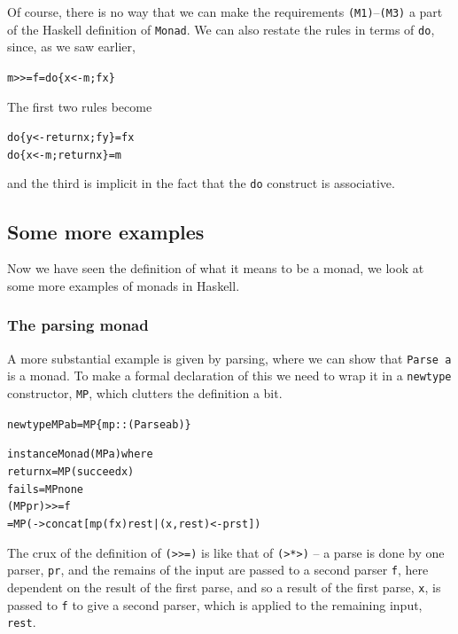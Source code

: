Of course, there is no way that we can make the requirements \texttt{(M1)}--\texttt{(M3)} 
a part of
the Haskell definition of \texttt{Monad}. 
We can also restate the rules in terms of
\texttt{do}, since, as we saw earlier,
\begin{alltt}
m >>= f  =  do \{ x <- m; f x \}
\end{alltt}
The first two rules become
\begin{alltt}
do \{ y <- return x; f y \} =  f x
do \{ x <- m; return x \}   =  m
\end{alltt}
and the third is implicit in the fact that the \texttt{do}
construct is associative.


\subsection*{Some more examples}

Now we have seen the definition of what it means to be a monad, we look at some more examples of monads in Haskell.



\subsubsection*{The parsing monad}


A more substantial example is given by parsing, where we can show that
\texttt{Parse a} is a monad. To make a formal declaration of this we
need to wrap it in a \texttt{newtype} constructor, \texttt{MP},
which clutters the definition a bit.
\begin{alltt}
newtype MP a b = MP \{ mp :: (Parse a b) \}

instance Monad (MP a) where
  return x = MP (succeed x)
  fail s   = MP none
  (MP pr) >>= f 
    = MP ( -> concat [ mp (f x) rest | (x,rest) <- pr st ])
\end{alltt}
The crux of the definition of \texttt{(>>=)} is like that of
\texttt{(>*>)} -- a parse is done by one parser, \texttt{pr}, and the remains of the
input are passed to a second parser \texttt{f}, here dependent on the result of the
first parse, and so a result of the first parse, \texttt{x}, is passed
to \texttt{f} to give a second parser, which is applied to the remaining
input, \texttt{rest}.

